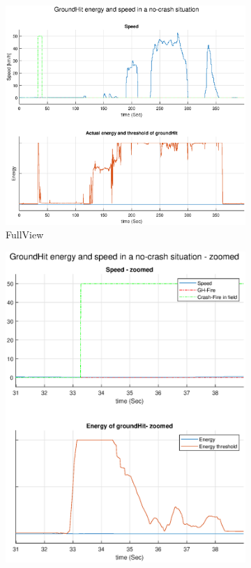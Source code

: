 \begin{figure}[H] %
	\centering
	\begin{subfigure}{0.58\textwidth}
		\centering
		\includegraphics[width=\textwidth]{Bilder/GH_speed_GHEnergy_FullView_eps.eps}
		\caption{FullView}
		\label{fig:GH_speed_GHEnergy_FullView_eps}
	\end{subfigure}
		\hfill
	\begin{subfigure}{0.41\textwidth}
		\centering
		\includegraphics[width=\textwidth]{Bilder/GH_speed_GHEnergy_zoomed_eps.eps}

\end{subfigure}
\end{figure}

